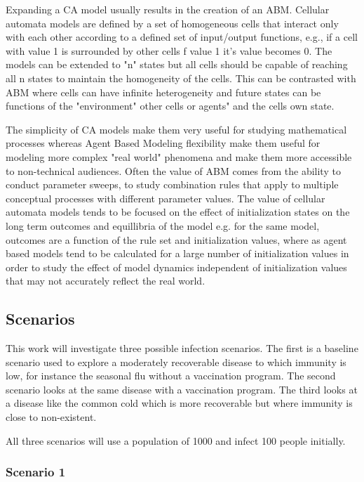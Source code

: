 \documentclass[11pt]{article} %
\begin{document}
Expanding a CA model usually results in the creation of an ABM.  Cellular automata models are defined by a set of homogeneous cells that interact only with each other according to a defined set of input/output functions, e.g., if a cell with value 1 is surrounded by other cells f value 1 it's value becomes 0. The models can be extended to "n" states but all cells should be capable of reaching all n states to maintain the homogeneity of the cells. This can be contrasted with ABM where cells can have infinite heterogeneity and future states can be functions of the "environment" other cells or agents" and the cells own state. 

The simplicity of CA models make them very useful for studying mathematical processes whereas Agent Based Modeling flexibility make them useful for modeling more complex "real world" phenomena and make them more accessible to non-technical audiences. Often the value of ABM comes from the ability to conduct parameter sweeps, to study combination rules that apply to multiple conceptual processes with different parameter values. The value of cellular automata models tends to be focused on the effect of initialization states on the long term outcomes and equillibria of the model e.g. for the same model, outcomes are a function of the rule set and initialization values, where as agent based models tend to be calculated for a large number of initialization values in order to study the effect of model dynamics independent of initialization values that may not accurately reflect the real world. 

\subsection{Scenarios}

This work will investigate three possible infection scenarios. The first is a baseline scenario used to explore a moderately recoverable disease to which immunity is low, for instance the seasonal flu without a vaccination program. The second scenario looks at the same disease with a vaccination program. The third looks at a disease like the common cold which is more recoverable but where immunity is close to non-existent. 

All three scenarios will use a population of 1000 and infect 100 people initially. 

\subsubsection{Scenario 1}
\end{document}
